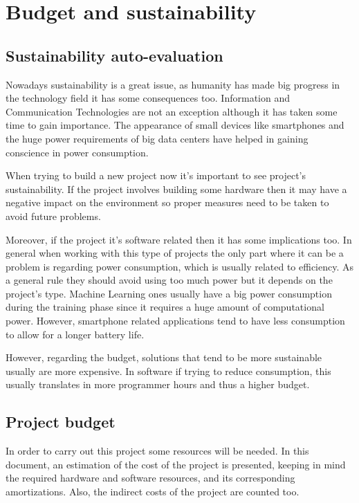 \section{Budget and sustainability}

\subsection{Sustainability auto-evaluation}

Nowadays sustainability is a great issue, as humanity has made big progress in the technology
field it has some consequences too. Information and Communication Technologies are not 
an exception although it has taken some time to gain importance. The appearance of 
small devices like smartphones and the huge power requirements of big data centers have 
helped in gaining conscience in power consumption. 

When trying to build a new project now it's important to see project's sustainability. If the
project involves building some hardware then it may have a negative impact on the environment
so proper measures need to be taken to avoid future problems.

Moreover, if the project it's software related then it has some implications too. In general
when working with this type of projects the only part where it can be a problem is regarding
power consumption, which is usually related to efficiency. As a general rule they should
avoid using too much power but it depends on the project's type. Machine Learning ones
usually have a big power consumption during the training phase since it requires a huge
amount of computational power. However, smartphone related applications tend to have less
consumption to allow for a longer battery life.

However, regarding the budget, solutions that tend to be more sustainable usually are more
expensive. In software if trying to reduce consumption, this usually translates in more
programmer hours and thus a higher budget.

\subsection{Project budget \label{sec:budget}}

In order to carry out this project some resources will be needed. In this document, 
an estimation of the cost of the project is presented, keeping in mind the required
hardware and software resources, and its corresponding amortizations. Also, the
indirect costs of the project are counted too.

